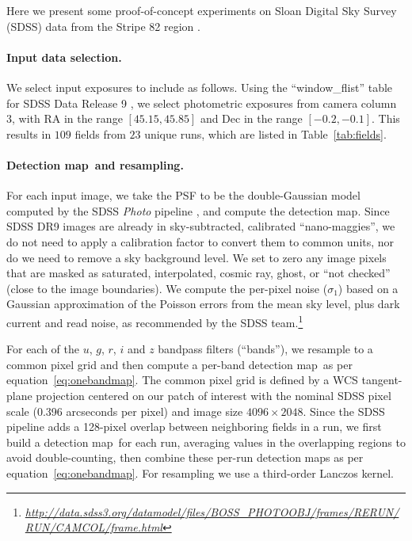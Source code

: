 \documentclass[letterpaper,preprint]{aastex}
\newcommand{\equationname}{equation}
\newcommand{\eqnref}[1]{\mbox{\equationname~\ref{#1}}}
\newcommand{\tabref}[1]{\mbox{Table~\ref{#1}}}
\newcommand{\niceurl}[1]{\mbox{\href{#1}{\textsl{#1}}}}
\newcommand{\detmap}{detection map}
\newcommand{\Detmap}{Detection map}
\begin{document}
Here we present some proof-of-concept experiments on Sloan Digital Sky
Survey (SDSS) data from the Stripe 82 region \cite{sdss}.


\paragraph{Input data selection.}
We select input exposures to include as follows.  Using the
``window\_flist'' table for SDSS Data Release 9 \cite{dr9}, we select
photometric exposures from camera column 3, with RA in the range
$[45.15, 45.85]$ and Dec in the range $[-0.2, -0.1]$.  This results in
$109$ fields from $23$ unique runs, which are listed in
\tabref{tab:fields}.

\paragraph{\Detmap\ and resampling.}
For each input image, we take the PSF to be the double-Gaussian model
computed by the SDSS \emph{Photo} pipeline \citep{photo, sdss-edr}, and compute
the \detmap.  Since SDSS DR9 images are already in sky-subtracted,
calibrated ``nano-maggies'', we do not need to apply a calibration
factor to convert them to common units, nor do we need to remove a sky
background level.  We set to zero any image pixels that are masked as
saturated, interpolated, cosmic ray, ghost, or ``not checked'' (close
to the image boundaries).
We compute the per-pixel noise ($\sigma_1$) based on a Gaussian
approximation of the Poisson errors from the mean sky level, plus dark
current and read noise, as recommended by the SDSS
team.\footnote{\niceurl{http://data.sdss3.org/datamodel/files/BOSS\_PHOTOOBJ/frames/RERUN/RUN/CAMCOL/frame.html}}


For each of the $u$, $g$, $r$, $i$ and $z$ bandpass filters
(``bands''), we resample to a common pixel grid and then compute a
per-band \detmap\ as per \eqnref{eq:onebandmap}.  The common pixel
grid is defined by a WCS tangent-plane projection centered on our
patch of interest with the nominal SDSS pixel scale (0.396 arcseconds
per pixel) and image size $4096 \times 2048$. 
Since the
SDSS pipeline adds a 128-pixel overlap between neighboring fields in a
run, we first build a \detmap\ for each run, averaging values in the
overlapping regions to avoid double-counting, then combine these
per-run \detmap s as per \eqnref{eq:onebandmap}.  For resampling we
use a third-order Lanczos kernel.
\end{document}
